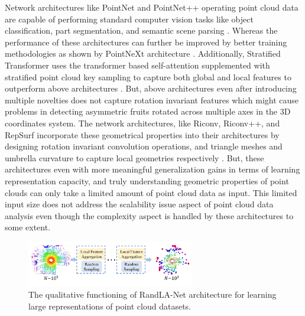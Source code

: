 \documentclass{article}
\begin{document}
Network architectures like PointNet and PointNet++ operating point cloud data are capable of performing standard computer vision tasks like object classification, part segmentation, and semantic scene parsing \cite{qi2017pointnet, qi2017pointnet++}.
Whereas the performance of these architectures can further be improved by better training methodologies as shown by PointNeXt architecture \cite{qian2022pointnext}.
Additionally, Stratified Transformer uses the transformer based self-attention supplemented with stratified point cloud key sampling to capture both global and local features to outperform above architectures \cite{lai2022stratified}.
But, above architectures even after introducing multiple novelties does not capture rotation invariant features which might cause problems in detecting asymmetric fruits rotated across multiple axes in the 3D coordinates system.
The network architectures, like Riconv, Riconv++, and RepSurf incorporate these geometrical properties into their architectures by designing rotation invariant convolution operations, and triangle meshes and umbrella curvature to capture local geometries respectively \cite{zhang2019rotation, zhang2022riconv++, ran2022surface}.
But, these architectures even with more meaningful generalization gains in terms of learning representation capacity, and truly understanding geometric properties of point clouds can only take a limited amount of point cloud data as input.
This limited input size does not address the scalability issue aspect of point cloud data analysis even though the complexity aspect is handled by these architectures to some extent.


\begin{figure}[h]
    \centering
    \includegraphics[width=0.65\textwidth]{randla-net-working.png}
    \caption{The qualitative functioning of RandLA-Net architecture for learning large representations of point cloud datasets.}
    \label{fig:randla-net}
\end{figure}
\end{document}
